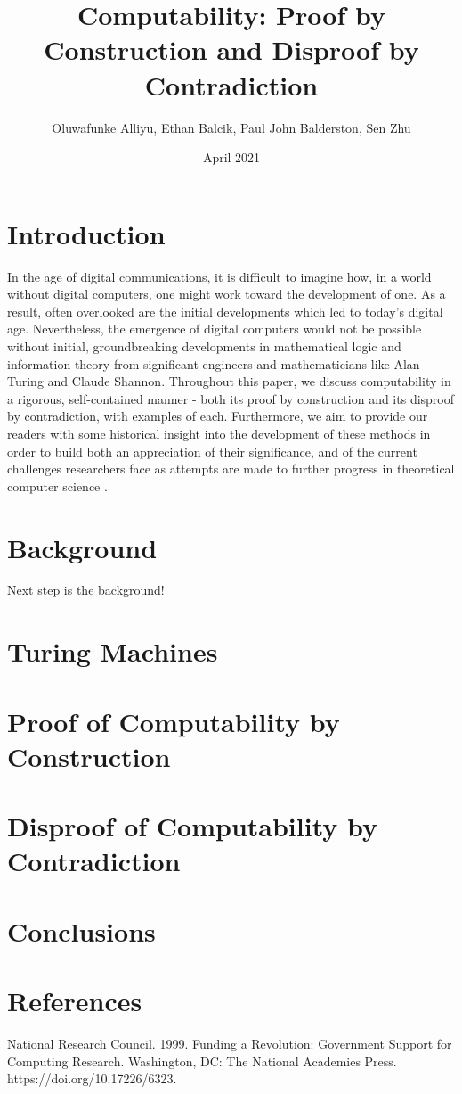 \documentclass{article}
\title{Computability: Proof by Construction and Disproof by Contradiction}
\author{Oluwafunke Alliyu, Ethan Balcik, Paul John Balderston, Sen Zhu}
\date{April 2021}
\begin{document}
\maketitle

\section{Introduction}
In the age of digital communications, it is difficult to imagine how, in a world without digital computers, one might work toward the development of one.  As a result, often overlooked are the initial developments which led to today's digital age.  Nevertheless, the emergence of digital computers would not be possible without initial, groundbreaking developments in mathematical logic and information theory from significant engineers and mathematicians like Alan Turing and Claude Shannon.  Throughout this paper, we discuss computability in a rigorous, self-contained manner - both its proof by construction and its disproof by contradiction, with examples of each.  Furthermore, we aim to provide our readers with some historical insight into the development of these methods in order to build both an appreciation of their significance, and of the current challenges researchers face as attempts are made to further progress in theoretical computer science \cite{1}.

\section{Background}
Next step is the background!

\section{Turing Machines}
\section{Proof of Computability by Construction}
\section{Disproof of Computability by Contradiction}
\section{Conclusions}
\section{References}
\begin{thebibliography}{100}
 National Research Council. 1999. Funding a Revolution: Government Support for Computing Research. Washington, DC: The National Academies Press. https://doi.org/10.17226/6323.
\end{thebibliography}
\end{document}
